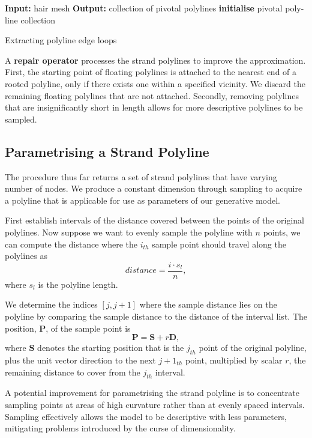\documentclass[ %
author={Dillon Keith Diep},
supervisor={Dr. Carl Henrik Ek},
degree={MEng},
title={ART-CG:},
subtitle={Assisted Real-time Content Generation of 3D Hair by Learning Manifolds},
type={Research},
year={2017} ]{dissertation}
\begin{document}
\begin{algorithm}[!h]
	\algrule
	\textbf{Input:} hair mesh\;
	\textbf{Output:} collection of pivotal polylines\;
	\algrule
	\textbf{initialise}\;
	\Return pivotal poly-line collection\;
	\caption{Extracting polyline edge loops}
\end{algorithm}

A \textbf{repair operator} processes the strand polylines to improve the approximation. First, the starting point of floating polylines is attached to the nearest end of a rooted polyline, only if there exists one within a specified vicinity. We discard the remaining floating polylines that are not attached. Secondly, removing polylines that are insignificantly short in length allows for more descriptive polylines to be sampled.

\subsection{Parametrising a Strand Polyline}
The procedure thus far returns a set of strand polylines that have varying number of nodes. We produce a constant dimension through sampling to acquire a polyline that is applicable for use as parameters of our generative model.

First establish intervals of the distance covered between the points of the original polylines. Now suppose we want to evenly sample the polyline with $n$ points, we can compute the distance where the $i_{th}$ sample point should travel along the polylines as
$$distance=\frac{i \cdot s_l}{n},$$
where $s_l$ is the polyline length.

We determine the indices $[j, j+1]$ where the sample distance lies on the polyline by comparing the sample distance to the distance of the interval list. The position, $\bm{P}$, of the sample point is
$$\bm{P} = \bm{S} + r\bm{D},$$
where $\bm{S}$ denotes the starting position that is the $j_{th}$ point of the original polyline, plus the unit vector direction to the next $j+1_{th}$ point, multiplied by scalar $r$, the remaining distance to cover from the $j_{th}$ interval.

A potential improvement for parametrising the strand polyline is to concentrate sampling points at areas of high curvature rather than at evenly spaced intervals. Sampling effectively allows the model to be descriptive with less parameters, mitigating problems introduced by the curse of dimensionality.
\end{document}
